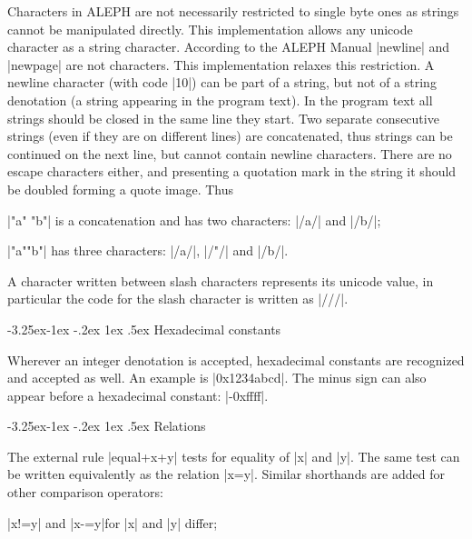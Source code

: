 \documentclass[titlepage]{article}
\makeatletter
\newcommand\A{\textsf{ALEPH}}
\newcommand\g[1]{\textsf{#1}}
\renewcommand\subsection{%
\@startsection{subsection}{2}{\z@}%
   {-3.25ex\@plus -1ex \@minus -.2ex}%
   {1ex \@plus .5ex}%
   {\normalfont\normalsize\bfseries}}
\makeatother
\begin{document}
Characters in \A{} are not necessarily restricted to single byte ones as
strings cannot be manipulated directly. This implementation allows any
unicode character as a string character. According to the \A{} Manual
\pp|newline| and \pp|newpage| are not characters. This implementation
relaxes this restriction. A newline character (with code \pp|10|) can be
part of a string, but not of a \g{string denotation} (a string appearing in
the program text). In the program text all strings should be closed in the
same line they start. Two separate consecutive strings (even if they are on
different lines) are concatenated, thus strings can be continued on the next
line, but cannot contain newline characters. There are no escape characters
either, and presenting a quotation mark in the string it should be doubled
forming a \g{quote image}. Thus

\smallskip

\HH\pp|"a" "b"| \HE is a concatenation and has two characters: \pp|/a/| and
\pp|/b/|;

\HH\pp|"a""b"|  \HE has three characters: \pp|/a/|, \pp|/"/| and \pp|/b/|.

\smallskip
\noindent
A character written between slash characters represents its unicode value,
in particular the code for the slash character is written as \pp|///|.
 

\subsection{Hexadecimal constants}

Wherever an \g{integer denotation} is accepted, hexadecimal constants are
recognized and accepted as well. An example is \pp|0x1234abcd|. The
minus sign can also appear before a hexadecimal constant: \pp|-0xffff|.


\subsection{Relations}\label{subsec:relations}

The external rule \pp|equal+x+y| tests for equality of \pp|x| and \pp|y|.
The same test can be written equivalently as the \g{relation} \pp|x=y|.
Similar shorthands are added for other comparison operators:

\smallskip

\HH\pp|x!=y| and \pp|x-=y|\HE  for \pp|x| and \pp|y| differ;
\end{document}
